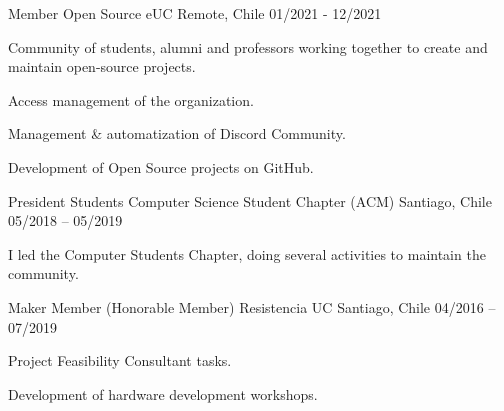 

\begin{cventries}

  \cventry
    {Member} %
    {Open Source eUC} %
    {Remote, Chile} %
    {01/2021 - 12/2021} %
    {
      \begin{cvitems} %
        \item {Community of students, alumni and professors working together to create and maintain open-source projects.}
        \item {Access management of the organization.}
        \item {Management \& automatization of Discord Community.}
        \item {Development of Open Source projects on GitHub.}
      \end{cvitems}
    }

  \cventry
    {President} %
    {Students Computer Science Student Chapter (ACM)} %
    {Santiago, Chile} %
    {05/2018 – 05/2019} %
    {
      \begin{cvitems} %
        \item {I led the Computer Students Chapter, doing several activities to maintain the community.}
      \end{cvitems}
    }


  \cventry
    {Maker Member (Honorable Member)} %
    {Resistencia UC} %
    {Santiago, Chile} %
    {04/2016 – 07/2019} %
    {
      \begin{cvitems} %
        \item {Project Feasibility Consultant tasks.}
        \item {Development of hardware development workshops.}
      \end{cvitems}
    }


\end{cventries}
